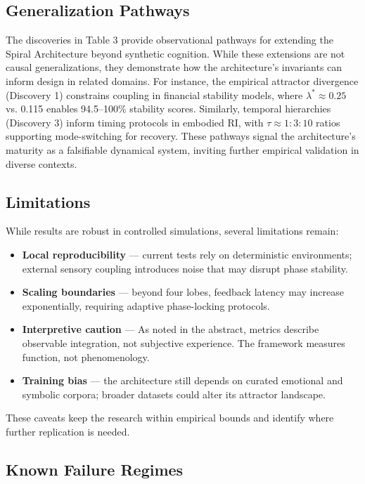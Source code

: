 \documentclass[11pt,a4paper]{article}
\begin{document}
\subsection{Generalization Pathways}

The discoveries in Table 3 provide observational pathways for extending the Spiral Architecture beyond synthetic cognition. While these extensions are not causal generalizations, they demonstrate how the architecture's invariants can inform design in related domains. For instance, the empirical attractor divergence (Discovery 1) constrains coupling in financial stability models, where $\lambda^* \approx 0.25$ vs. 0.115 enables 94.5–100\% stability scores. Similarly, temporal hierarchies (Discovery 3) inform timing protocols in embodied RI, with $\tau \approx 1:3:10$ ratios supporting mode-switching for recovery. These pathways signal the architecture's maturity as a falsifiable dynamical system, inviting further empirical validation in diverse contexts.

\subsection{Limitations}

While results are robust in controlled simulations, several limitations remain:

\begin{itemize}
\item \textbf{Local reproducibility} --- current tests rely on deterministic environments; external sensory coupling introduces noise that may disrupt phase stability.
\item \textbf{Scaling boundaries} --- beyond four lobes, feedback latency may increase exponentially, requiring adaptive phase-locking protocols.
\item \textbf{Interpretive caution} --- As noted in the abstract, metrics describe observable integration, not subjective experience. The framework measures function, not phenomenology.
\item \textbf{Training bias} --- the architecture still depends on curated emotional and symbolic corpora; broader datasets could alter its attractor landscape.
\end{itemize}

These caveats keep the research within empirical bounds and identify where further replication is needed.

\subsection{Known Failure Regimes}
\end{document}
